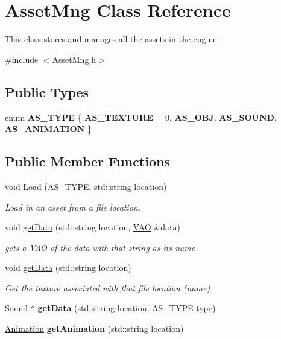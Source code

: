 \hypertarget{class_asset_mng}{\section{Asset\-Mng Class Reference}
\label{class_asset_mng}
}


This class stores and manages all the assets in the engine.  




{\ttfamily \#include $<$Asset\-Mng.\-h$>$}

\subsection*{Public Types}
\begin{DoxyCompactItemize}
\item 
enum {\bfseries A\-S\-\_\-\-T\-Y\-P\-E} \{ {\bfseries A\-S\-\_\-\-T\-E\-X\-T\-U\-R\-E} = 0, 
{\bfseries A\-S\-\_\-\-O\-B\-J}, 
{\bfseries A\-S\-\_\-\-S\-O\-U\-N\-D}, 
{\bfseries A\-S\-\_\-\-A\-N\-I\-M\-A\-T\-I\-O\-N}
 \}
\end{DoxyCompactItemize}
\subsection*{Public Member Functions}
\begin{DoxyCompactItemize}
\item 
void \hyperlink{class_asset_mng_acd178c7a87bd71842e3af302c79983dd}{Load} (A\-S\-\_\-\-T\-Y\-P\-E, std\-::string location)
\begin{DoxyCompactList}\small\item\em Load in an asset from a file location. \end{DoxyCompactList}\item 
void \hyperlink{class_asset_mng_a2301ce67cfccde7ada003e61ff3cab4f}{get\-Data} (std\-::string location, \hyperlink{class_v_a_o}{V\-A\-O} \&data)
\begin{DoxyCompactList}\small\item\em gets a \hyperlink{class_v_a_o}{V\-A\-O} of the data with that string as its name \end{DoxyCompactList}\item 
void \hyperlink{class_asset_mng_a431fb64b5423f187ff2902eebfdcf654}{get\-Data} (std\-::string location)
\begin{DoxyCompactList}\small\item\em Get the texture associated with that file location (name) \end{DoxyCompactList}\item 
\hypertarget{class_asset_mng_ab5822835e28bcc2bf755f6bdea3d4fbf}{\hyperlink{class_sound}{Sound} $\ast$ {\bfseries get\-Data} (std\-::string location, A\-S\-\_\-\-T\-Y\-P\-E type)}\label{class_asset_mng_ab5822835e28bcc2bf755f6bdea3d4fbf}

\item 
\hypertarget{class_asset_mng_ab29a4cc72f609909621a2372e916f18a}{\hyperlink{class_animation}{Animation} {\bfseries get\-Animation} (std\-::string location)}\label{class_asset_mng_ab29a4cc72f609909621a2372e916f18a}

\end{DoxyCompactItemize}


